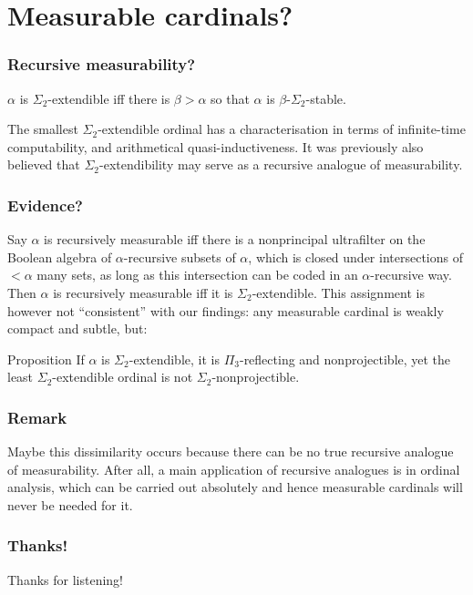 \documentclass{beamer}
\begin{document}
\section{Measurable cardinals?}

\begin{frame}
\frametitle{Recursive measurability?}
$\alpha$ is $\Sigma_2$-extendible iff there is $\beta > \alpha$ so that $\alpha$ is $\beta$-$\Sigma_2$-stable.

The smallest $\Sigma_2$-extendible ordinal has a characterisation in terms of infinite-time computability, and arithmetical quasi-inductiveness. It was previously also believed that $\Sigma_2$-extendibility may serve as a recursive analogue of measurability.
\end{frame}

\begin{frame}
\frametitle{Evidence?}
Say $\alpha$ is recursively measurable iff there is a nonprincipal ultrafilter on the Boolean algebra of $\alpha$-recursive subsets of $\alpha$, which is closed under intersections of $< \alpha$ many sets, as long as this intersection can be coded in an $\alpha$-recursive way. Then $\alpha$ is recursively measurable iff it is $\Sigma_2$-extendible. \pause This assignment is however not ``consistent'' with our findings: any measurable cardinal is weakly compact and subtle, but:

\begin{block}{Proposition}
If $\alpha$ is $\Sigma_2$-extendible, it is $\Pi_3$-reflecting and nonprojectible, yet the least $\Sigma_2$-extendible ordinal is not $\Sigma_2$-nonprojectible.
\end{block}
\end{frame}

\begin{frame}
\frametitle{Remark}
Maybe this dissimilarity occurs because there can be no true recursive analogue of measurability. After all, a main application of recursive analogues is in ordinal analysis, which can be carried out absolutely and hence measurable cardinals will never be needed for it.
\end{frame}

\begin{frame}
\frametitle{Thanks!}
Thanks for listening!
\end{frame}
\end{document}
